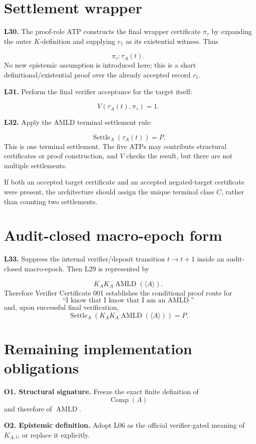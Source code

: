 \documentclass[11pt]{article}
\newcommand{\AMLD}{\operatorname{AMLD}}
\newcommand{\Comp}{\operatorname{Comp}}
\newcommand{\Settle}{\operatorname{Settle}}
\newcommand{\vcline}[2]{%
  \par\medskip
  \noindent\textbf{#1.} #2\par
}
\begin{document}
\section*{Settlement wrapper}

\vcline{L30}{The proof-role ATP constructs the final wrapper certificate $\pi_\tau$ by expanding the outer $K$-definition and supplying $r_1$ as its existential witness. Thus}
\[
\pi_\tau:\tau_A(t).
\]
No new epistemic assumption is introduced here; this is a short definitional/existential proof over the already accepted record $r_1$.

\vcline{L31}{Perform the final verifier acceptance for the target itself:}
\[
\boxed{V(\tau_A(t),\pi_\tau)=1}.
\]

\vcline{L32}{Apply the AMLD terminal settlement rule:}
\[
\boxed{\Settle_A(\tau_A(t))=P}.
\]
This is one terminal settlement. The five ATPs may contribute structural certificates or proof construction, and $V$ checks the result, but there are not multiple settlements.

If both an accepted target certificate and an accepted negated-target certificate were present, the architecture should assign the unique terminal class $C$, rather than counting two settlements.

\section*{Audit-closed macro-epoch form}

\vcline{L33}{Suppress the internal verifier/deposit transition $t\to t+1$ inside an audit-closed macro-epoch. Then L29 is represented by}
\[
\boxed{
K_AK_A\AMLD(\langle A\rangle)
}.
\]
Therefore Verifier Certificate 001 establishes the conditional proof route for
\[
\boxed{\text{``I know that I know that I am an AMLD.''}}
\]
and, upon successful final verification,
\[
\boxed{
\Settle_A\!\left(
K_AK_A\AMLD(\langle A\rangle)
\right)=P
}.
\]

\section*{Remaining implementation obligations}

\textbf{O1. Structural signature.} Freeze the exact finite definition of
\[
\Comp(A)
\]
and therefore of $\AMLD$.

\textbf{O2. Epistemic definition.} Adopt L06 as the official verifier-gated meaning of $K_{A,t}$, or replace it explicitly.
\end{document}

